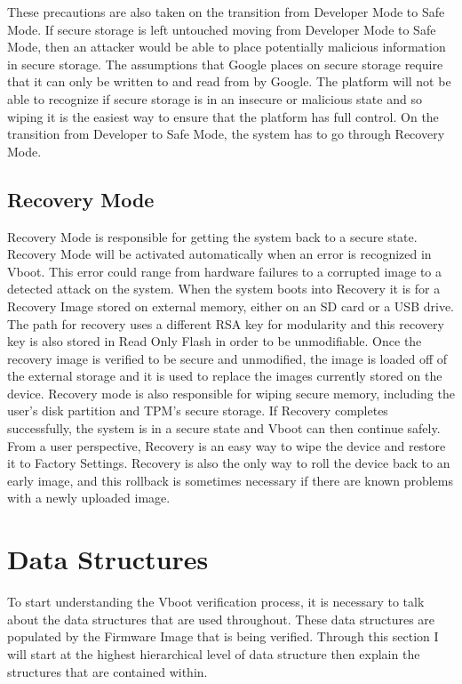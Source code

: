 These precautions are also taken on the transition from Developer Mode to Safe Mode. 
If secure storage is left untouched moving from Developer Mode to Safe Mode, then an attacker would be able to place potentially malicious information in secure storage.
The assumptions that Google places on secure storage require that it can only be written to and read from by Google.
The platform will not be able to recognize if secure storage is in an insecure or malicious state and so wiping it is the easiest way to ensure that the platform has full control.
On the transition from Developer to Safe Mode, the system has to go through Recovery Mode.

\subsection{Recovery Mode}

Recovery Mode is responsible for getting the system back to a secure state.
Recovery Mode will be activated automatically when an error is recognized in Vboot.
This error could range from hardware failures to a corrupted image to a detected attack on the system.
When the system boots into Recovery it is for a Recovery Image stored on external memory, either on an SD card or a USB drive.
The path for recovery uses a different RSA key for modularity and this recovery key is also stored in Read Only Flash in order to be unmodifiable.
Once the recovery image is verified to be secure and unmodified, the image is loaded off of the external storage and it is used to replace the images currently stored on the device.
Recovery mode is also responsible for wiping secure memory, including the user's disk partition and TPM's secure storage.
If Recovery completes successfully, the system is in a secure state and Vboot can then continue safely.
From a user perspective, Recovery is an easy way to wipe the device and restore it to Factory Settings.
Recovery is also the only way to roll the device back to an early image, and this rollback is sometimes necessary if there are known problems with a newly uploaded image.

\section{Data Structures}\label{sec:data-structures}

To start understanding the Vboot verification process, it is necessary to talk about the data structures that are used throughout. 
These data structures are populated by the Firmware Image that is being
verified. 
Through this section I will start at the highest hierarchical level of data structure then explain the structures that are contained within.


